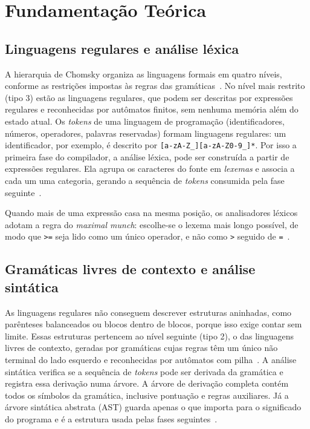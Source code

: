 \documentclass[conference]{IEEEtran}
\begin{document}
\section{Fundamentação Teórica}
\label{sec:fundamentos}

\subsection{Linguagens regulares e análise léxica}
A hierarquia de Chomsky organiza as linguagens formais em quatro níveis,
conforme as restrições impostas às regras das
gramáticas~\cite{hopcroft2006}. No nível mais restrito (tipo 3) estão as
linguagens regulares, que podem ser descritas por expressões regulares e
reconhecidas por autômatos finitos, sem nenhuma memória além do estado
atual. Os \textit{tokens} de uma linguagem de programação (identificadores,
números, operadores, palavras reservadas) formam linguagens regulares: um
identificador, por exemplo, é descrito por
\verb|[a-zA-Z_][a-zA-Z0-9_]*|. Por isso a primeira fase do compilador, a
análise léxica, pode ser construída a partir de expressões regulares. Ela
agrupa os caracteres do fonte em \textit{lexemas} e associa a cada um uma
categoria, gerando a sequência de \textit{tokens} consumida pela fase
seguinte~\cite{aho2007}.

Quando mais de uma expressão casa na mesma posição, os analisadores
léxicos adotam a regra do \textit{maximal munch}: escolhe-se o lexema mais
longo possível, de modo que \texttt{>=} seja lido como um único operador, e
não como \texttt{>} seguido de \texttt{=}~\cite{aho2007}.

\subsection{Gramáticas livres de contexto e análise sintática}
As linguagens regulares não conseguem descrever estruturas aninhadas, como
parênteses balanceados ou blocos dentro de blocos, porque isso exige
contar sem limite. Essas estruturas pertencem ao nível seguinte (tipo 2),
o das linguagens livres de contexto, geradas por gramáticas cujas regras
têm um único não terminal do lado esquerdo e reconhecidas por autômatos
com pilha~\cite{hopcroft2006}. A análise sintática verifica se a sequência
de \textit{tokens} pode ser derivada da gramática e registra essa
derivação numa árvore. A árvore de derivação completa contém todos os
símbolos da gramática, inclusive pontuação e regras auxiliares. Já a
árvore sintática abstrata (AST) guarda apenas o que importa para o
significado do programa e é a estrutura usada pelas fases
seguintes~\cite{aho2007}.
\end{document}
